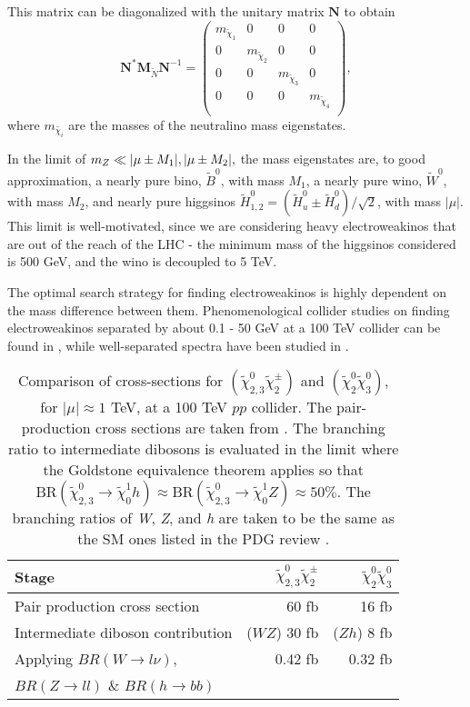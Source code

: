 This matrix can be diagonalized with the unitary matrix $\mathbf{N}$ to obtain 
\[\mathbf{N}^*\mathbf{M}_{\widetilde{N}}\mathbf{N}^{-1} =
\begin{pmatrix}
  m_{\widetilde{\chi}_1} & 0 & 0 & 0\\
  0 & m_{\widetilde{\chi}_2} & 0 & 0 \\
  0 & 0 & m_{\widetilde{\chi}_3} & 0 \\
  0 & 0 & 0 &  m_{\widetilde{\chi}_4} \\
\end{pmatrix},
\]
where $m_{\widetilde{\chi_i}}$ are the masses of the neutralino mass eigenstates. 

In the limit of $m_Z \ll |\mu\pm M_1|, |\mu\pm M_2|,$ the mass eigenstates are, to good approximation, a nearly pure bino, $\widetilde{B}^0$, with mass $M_1$, a nearly pure wino, $\widetilde{W}^0$, with mass $M_2$, and nearly pure higgsinos $\widetilde{H}^0_{1,2} = (\widetilde{H}_u^0 \pm \widetilde{H}_d^0)/\sqrt{2}$, with mass $|\mu|$. This limit is well-motivated, since we are considering heavy electroweakinos that are out of the reach of the LHC - the minimum mass of the higgsinos considered is 500 GeV, and the wino is decoupled to 5 TeV. 

The optimal search strategy for finding electroweakinos is highly dependent on the mass difference between them. Phenomenological collider studies on finding electroweakinos separated by about 0.1 - 50 GeV at a 100 TeV collider can be found in \citep{Low:2014cba, Plehn:2009nd, Berlin:2015aba, Cirelli:2014dsa}, while well-separated spectra have been studied in \citep{Gori:2014oua, Acharya:2014pua}.

\begin{table}
\centering
\begin{tabular}{lrr}
\toprule
Stage & $\widetilde{\chi}_{2,3}^0\widetilde{\chi}^\pm_{2}$ & $\widetilde{\chi}^0_{2}\widetilde{\chi}^0_{3}$\\
\midrule
Pair production cross section & 60 fb & 16 fb\\
Intermediate diboson contribution & ($WZ$) 30 fb  & ($Zh$) 8 fb \\
Applying $BR(W\rightarrow l\nu)$, & 0.42 fb & 0.32 fb\\
$BR(Z\rightarrow ll)$ \& $BR(h\rightarrow bb)$ &&\\
\bottomrule
\end{tabular}
\caption{Comparison of cross-sections for $(\widetilde{\chi}_{2,3}^0\widetilde{\chi}^\pm_{2})$ and $(\widetilde{\chi}^0_{2}\widetilde{\chi}^0_{3})$, for $|\mu|\approx 1$ TeV, at a 100 TeV $pp$ collider. The pair-production cross sections are taken from \citep{Gori:2014oua}. The branching ratio to intermediate dibosons is evaluated in the limit where the Goldstone equivalence theorem applies so that $\text{BR}(\widetilde{\chi}_{2,3}^0\rightarrow \widetilde{\chi}_0^1h)\approx \text{BR}(\widetilde{\chi}_{2,3}^0\rightarrow \widetilde{\chi}_0^1Z) \approx 50\%$. The branching ratios of \emph{W}, \emph{Z}, and \emph{h} are taken to be the same as the SM ones listed in the PDG review \citep{Olive:2016xmw}.}
\label{tab:xsections}
\end{table}

